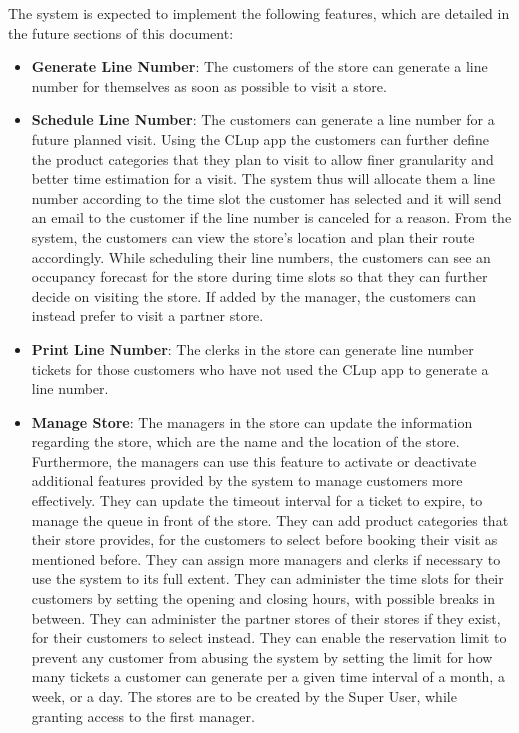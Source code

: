 The system is expected to implement the following features, which are detailed in the future sections of this document: \\
\begin{itemize}
    \item \textbf{Generate Line Number}: The customers of the store can generate a line number for themselves as soon as possible to visit a store.
    \item \textbf{Schedule Line Number}: The customers can generate a line number for a future planned visit.
    Using the CLup app the customers can further define the product categories that they plan to visit to allow finer granularity and better time estimation for a visit.
    The system thus will allocate them a line number according to the time slot the customer has selected and it will send an email to the customer if the line number is canceled for a reason.
    From the system, the customers can view the store's location and plan their route accordingly.
    While scheduling their line numbers, the customers can see an occupancy forecast for the store during time slots so that they can further decide on visiting the store.
    If added by the manager, the customers can instead prefer to visit a partner store.
    \item \textbf{Print Line Number}: The clerks in the store can generate line number tickets for those customers who have not used the CLup app to generate a line number.
    \item \textbf{Manage Store}: The managers in the store can update the information regarding the store, which are the name and the location of the store.
    Furthermore, the managers can use this feature to activate or deactivate additional features provided by the system to manage customers more effectively.
    They can update the timeout interval for a ticket to expire, to manage the queue in front of the store.
    They can add product categories that their store provides, for the customers to select before booking their visit as mentioned before.
    They can assign more managers and clerks if necessary to use the system to its full extent.
    They can administer the time slots for their customers by setting the opening and closing hours, with possible breaks in between.
    They can administer the partner stores of their stores if they exist, for their customers to select instead.
    They can enable the reservation limit to prevent any customer from abusing the system by setting the limit for how many tickets a customer can generate per a given time interval of a month, a week, or a day.
    The stores are to be created by the Super User, while granting access to the first manager.
\end{itemize}

